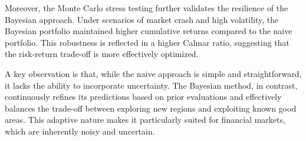\documentclass[a4paper,12pt]{article}
\begin{document}
Moreover, the Monte Carlo stress testing further validates the resilience of the Bayesian approach. Under scenarios of market crash and high volatility, the Bayesian portfolio maintained higher cumulative returns compared to the naive portfolio. This robustness is reflected in a higher Calmar ratio, suggesting that the risk-return trade-off is more effectively optimized.

A key observation is that, while the naive approach is simple and straightforward, it lacks the ability to incorporate uncertainty. The Bayesian method, in contrast, continuously refines its predictions based on prior evaluations and effectively balances the trade-off between exploring new regions and exploiting known good areas. This adaptive nature makes it particularly suited for financial markets, which are inherently noisy and uncertain.
\end{document}
